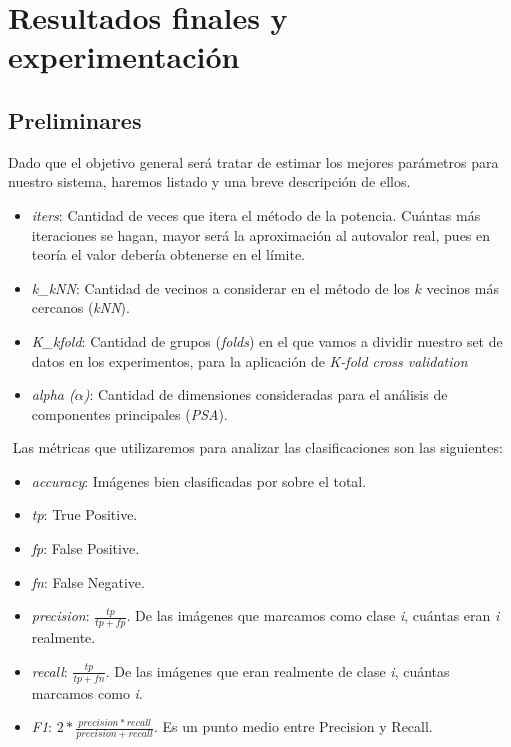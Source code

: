 \section{Resultados finales y experimentación}

\subsection{Preliminares}

Dado que el objetivo general será tratar de estimar los mejores parámetros para nuestro sistema, haremos listado y una breve descripción de ellos.

\begin{itemize}
\item \textit{iters}: Cantidad de veces que itera el método de la potencia. Cuántas más iteraciones se hagan, mayor será la aproximación al autovalor real, pues en teoría el valor debería obtenerse en el límite.

\item \textit{k\_kNN}: Cantidad de vecinos a considerar en el método de los $k$ vecinos más cercanos (\textit{kNN}).

\item \textit{K\_kfold}: Cantidad de grupos (\textit{folds}) en el que vamos a dividir nuestro set de datos en los experimentos, para la aplicación de \textit{K-fold cross validation}

\item \textit{alpha ($\alpha$)}: Cantidad de dimensiones consideradas para el análisis de componentes principales (\textit{PSA}).

\end{itemize}
$ $\newline
Las métricas que utilizaremos para analizar las clasificaciones son las siguientes:

\begin{itemize}

    \item \textit{accuracy}: Imágenes bien clasificadas por sobre el total.

    \item \textit{tp}: True Positive.

    \item \textit{fp}: False Positive.

    \item \textit{fn}: False Negative.

    \item \textit{precision}: $\frac{tp}{tp + fp}$. De las imágenes que marcamos como clase \textit{i}, cuántas eran \textit{i} realmente.

    \item \textit{recall}:  $\frac{tp}{tp + fn}$. De las imágenes que eran realmente de clase \textit{i}, cuántas marcamos como \textit{i}.

    \item \textit{F1}: $2 * \frac{precision * recall}{precision + recall}$. Es un punto medio entre Precision y Recall.

\end{itemize}



